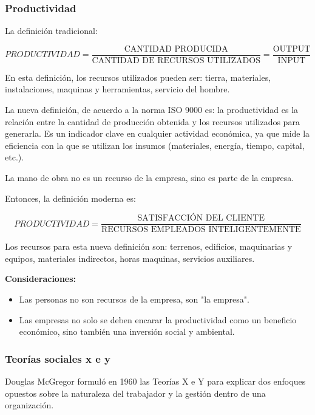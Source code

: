 \documentclass[a4paper,oneside,11pt]{article}
\begin{document}
\subsubsection{Productividad}

La definición tradicional:

\begin{equation}
    PRODUCTIVIDAD = \dfrac{\text{CANTIDAD PRODUCIDA}}{\text{CANTIDAD DE RECURSOS UTILIZADOS}} = \dfrac{\text{OUTPUT}}{\text{INPUT}}
\end{equation}

En esta definición, los recursos utilizados pueden ser: tierra, materiales, instalaciones, maquinas y herramientas, servicio del hombre.

La nueva definición, de acuerdo a la norma ISO 9000 es: la productividad es la relación entre la cantidad de producción obtenida y los recursos utilizados para generarla. Es un indicador clave en cualquier actividad económica, ya que mide la eficiencia con la que se utilizan los insumos (materiales, energía, tiempo, capital, etc.).

La mano de obra no es un recurso de la empresa, sino es parte de la empresa.

Entonces, la definición moderna es:

\begin{equation}
    PRODUCTIVIDAD = \frac{\text{SATISFACCIÓN DEL CLIENTE}}{\text{RECURSOS EMPLEADOS INTELIGENTEMENTE}}
\end{equation}

Los recursos para esta nueva definición son: terrenos, edificios, maquinarias y equipos, materiales indirectos, horas maquinas, servicios auxiliares.

\textbf{Consideraciones:}
\begin{itemize}
    \item Las personas no son recursos de la empresa, son "la empresa".
    \item Las empresas no solo se deben encarar la productividad como un beneficio económico, sino también una inversión social y ambiental.
\end{itemize}

\subsubsection{Teorías sociales x e y}

Douglas McGregor formuló en 1960 las Teorías X e Y para explicar dos enfoques opuestos sobre la naturaleza del trabajador y la gestión dentro de una organización.
\end{document}
